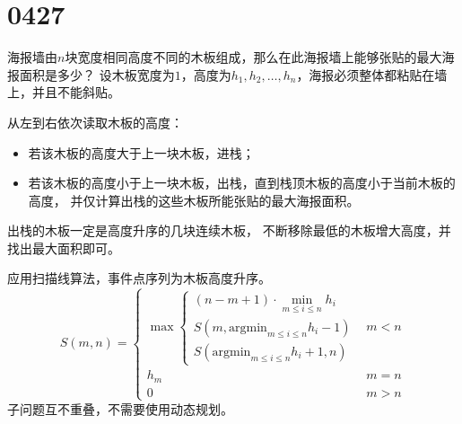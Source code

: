 \section{0427}\label{sec:0427}
\begin{questions}
    \question 海报墙由$n$块宽度相同高度不同的木板组成，那么在此海报墙上能够张贴的最大海报面积是多少？
    设木板宽度为$1$，高度为$h_1,h_2, \dots ,h_n$，海报必须整体都粘贴在墙上，并且不能斜贴。

    \begin{figure}[H]
        \centering
    \end{figure}

    \begin{solution}
        从左到右依次读取木板的高度：
        \begin{itemize}
            \item 若该木板的高度大于上一块木板，进栈；
            \item 若该木板的高度小于上一块木板，出栈，直到栈顶木板的高度小于当前木板的高度，
            并仅计算出栈的这些木板所能张贴的最大海报面积。
        \end{itemize}

        出栈的木板一定是高度升序的几块连续木板，
        不断移除最低的木板增大高度，并找出最大面积即可。

    \end{solution}

    \begin{solution}
        应用扫描线算法，事件点序列为木板高度升序。
        \[
            S(m,n) = \begin{cases}
                \max \begin{cases}
                    (n-m+1) \cdot \min_{m \le i \le n}{h_i}      \\
                    S(m,\mathrm{argmin}_{m \le i \le n}{h_i} -1) \\
                    S(\mathrm{argmin}_{m \le i \le n}{h_i} + 1, n)
                \end{cases} & m < n \\
                h_m                             & m = n \\
                0                               & m > n
            \end{cases}
        \]
        子问题互不重叠，不需要使用动态规划。


\end{solution}
\end{questions}
